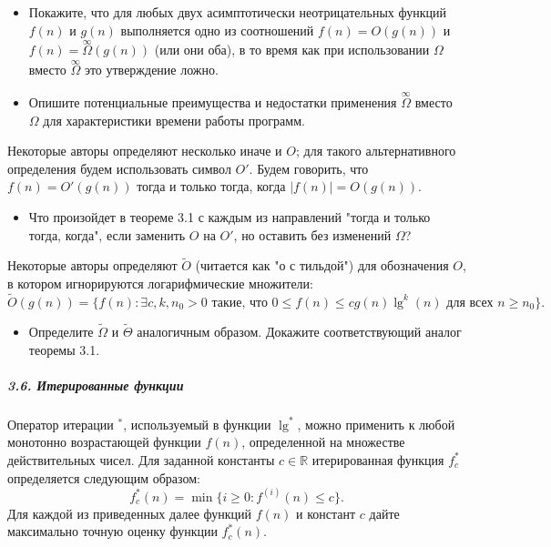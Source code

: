 \begin{itemize}
    \item[а.] Покажите, что для любых двух асимптотически неотрицательных функций $f(n)$ и $g(n)$ выполняется одно из соотношений $f(n) = O(g(n))$ и $f(n) = \overset{\infty}{\Omega}(g(n))$ (или они оба), в то время как при использовании $\Omega$ вместо $\overset{\infty}{\Omega}$ это утверждение ложно.
    \item[б.] Опишите потенциальные преимущества и недостатки применения $\overset{\infty}{\Omega}$ вместо $\Omega$ для характеристики времени работы программ.
\end{itemize}

Некоторые авторы определяют несколько иначе и $O$; для такого альтернативного определения будем использовать символ $O'$. Будем говорить, что $f(n) = O'(g(n))$ тогда и только тогда, когда $|f(n)| = O(g(n))$.

\begin{itemize}
    \item[в.] Что произойдет в теореме 3.1 с каждым из направлений "тогда и только тогда, когда", если заменить $O$ на $O'$, но оставить без изменений $\Omega$?
\end{itemize}

Некоторые авторы определяют $\tilde{O}$ (читается как "о с тильдой") для обозначения $O$, в котором игнорируются логарифмические множители:
\[ \tilde{O}(g(n)) = \{f(n) : \exists c, k, n_0 > 0 \text{ такие, что } 0 \le f(n) \le cg(n) \lg^k(n) \text{ для всех } n \ge n_0\}. \]

\begin{itemize}
    \item[г.] Определите $\tilde{\Omega}$ и $\tilde{\Theta}$ аналогичным образом. Докажите соответствующий аналог теоремы 3.1.
\end{itemize}

\subparagraph{3.6. Итерированные функции}
Оператор итерации $^*$, используемый в функции $\lg^*$, можно применить к любой монотонно возрастающей функции $f(n)$, определенной на множестве действительных чисел. Для заданной константы $c \in \mathbb{R}$ итерированная функция $f^*_c$ определяется следующим образом:
\[ f^*_c(n) = \min \{i \ge 0 : f^{(i)}(n) \le c\}. \]
Для каждой из приведенных далее функций $f(n)$ и констант $c$ дайте максимально точную оценку функции $f^*_c(n)$.

